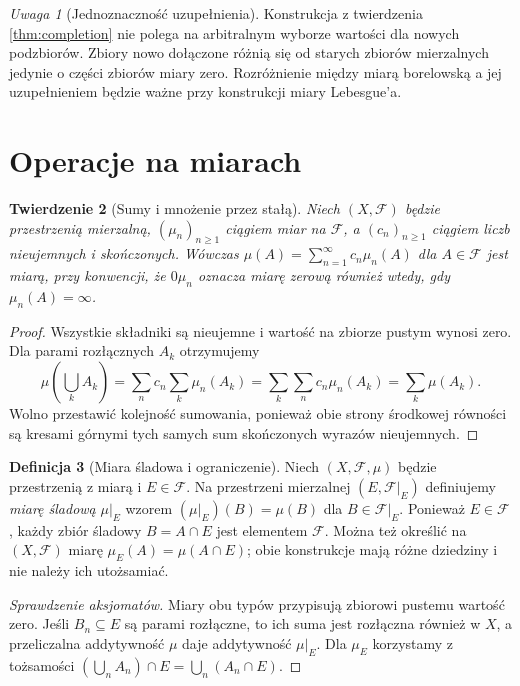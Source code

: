 \documentclass[11pt,a4paper,oneside]{book}
\numberwithin{equation}{chapter}
\theoremstyle{plain}
\newtheorem{twierdzenie}{Twierdzenie}[chapter]
\theoremstyle{definition}
\newtheorem{definicja}[twierdzenie]{Definicja}
\theoremstyle{remark}
\newtheorem{uwaga}[twierdzenie]{Uwaga}
\begin{document}
\begin{uwaga}[Jednoznaczność uzupełnienia]
Konstrukcja z twierdzenia \ref{thm:completion} nie polega
na arbitralnym wyborze wartości dla nowych podzbiorów.
Zbiory nowo dołączone różnią się od starych zbiorów
mierzalnych jedynie o części zbiorów miary zero.
Rozróżnienie między miarą borelowską a jej uzupełnieniem
będzie ważne przy konstrukcji miary Lebesgue'a.
\end{uwaga}

\section{Operacje na miarach}

\begin{twierdzenie}[Sumy i mnożenie przez stałą]
\label{thm:measure-operations}
Niech $(X,\mathcal F)$ będzie przestrzenią mierzalną,
$(\mu_n)_{n\geq1}$ ciągiem miar na $\mathcal F$,
a $(c_n)_{n\geq1}$ ciągiem liczb nieujemnych i skończonych.
Wówczas
$\mu(A)=\sum_{n=1}^{\infty}c_n\mu_n(A)$ dla $A\in\mathcal F$
jest miarą, przy konwencji, że $0\mu_n$ oznacza miarę
zerową również wtedy, gdy $\mu_n(A)=\infty$.
\end{twierdzenie}
\begin{proof}
Wszystkie składniki są nieujemne i wartość na zbiorze pustym
wynosi zero. Dla parami rozłącznych $A_k$ otrzymujemy
\[
\mu\left(\bigcup_kA_k\right)
=\sum_n c_n\sum_k\mu_n(A_k)
=\sum_k\sum_n c_n\mu_n(A_k)
=\sum_k\mu(A_k).
\]
Wolno przestawić kolejność sumowania, ponieważ obie strony
środkowej równości są kresami górnymi tych samych sum
skończonych wyrazów nieujemnych.
\end{proof}

\begin{definicja}[Miara śladowa i ograniczenie]
\label{def:restriction}
Niech $(X,\mathcal F,\mu)$ będzie przestrzenią z miarą
i $E\in\mathcal F$. Na przestrzeni mierzalnej
$(E,\mathcal F|_E)$ definiujemy \emph{miarę śladową}
$\mu|_E$ wzorem
$(\mu|_E)(B)=\mu(B)$ dla $B\in\mathcal F|_E$.
Ponieważ $E\in\mathcal F$, każdy zbiór śladowy
$B=A\cap E$ jest elementem $\mathcal F$.
Można też określić na $(X,\mathcal F)$ miarę
$\mu_E(A)=\mu(A\cap E)$; obie konstrukcje mają
różne dziedziny i nie należy ich utożsamiać.
\end{definicja}

\begin{proof}[Sprawdzenie aksjomatów]
Miary obu typów przypisują zbiorowi pustemu wartość zero.
Jeśli $B_n\subseteq E$ są parami rozłączne, to ich
suma jest rozłączna również w $X$, a przeliczalna
addytywność $\mu$ daje addytywność $\mu|_E$.
Dla $\mu_E$ korzystamy z tożsamości
$(\bigcup_nA_n)\cap E=\bigcup_n(A_n\cap E)$.
\end{proof}
\end{document}

